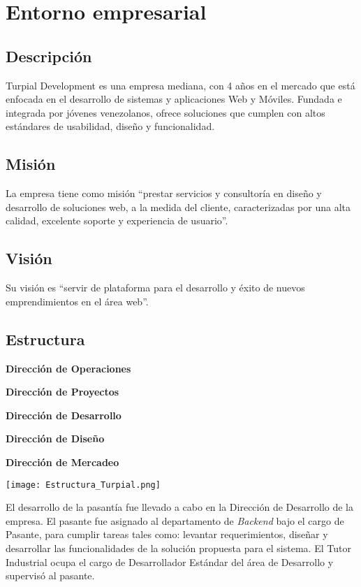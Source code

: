 \chapter{\textbf{Entorno empresarial}}

\thispagestyle{empty}

\section{Descripción}

Turpial Development es una empresa mediana, con 4 años en el mercado que está enfocada en el desarrollo de sistemas y aplicaciones Web y Móviles. Fundada e integrada por jóvenes venezolanos, ofrece soluciones que cumplen con altos estándares de usabilidad, diseño y funcionalidad.

\section{Misión}

La empresa tiene como misión “prestar servicios y consultoría en diseño y desarrollo de soluciones web, a la medida del cliente, caracterizadas por una alta calidad, excelente soporte y experiencia de usuario”.

\section{Visión}

Su visión es “servir de plataforma para el desarrollo y éxito de nuevos emprendimientos en el área web”.

\section{Estructura}

\begin{description}
    \item \textbf{Dirección de Operaciones}
    \item \textbf{Dirección de Proyectos}
    \item \textbf{Dirección de Desarrollo}
    \item \textbf{Dirección de Diseño}
    \item \textbf{Dirección de Mercadeo}
\end{description}

\texttt{[image: Estructura\_Turpial.png]}

El desarrollo de la pasantía fue llevado a cabo en la Dirección de Desarrollo de la empresa. El pasante fue asignado al departamento de \textit{Backend} bajo el cargo de Pasante, para cumplir tareas tales como: levantar requerimientos, diseñar y desarrollar las funcionalidades de la solución propuesta para el sistema. El Tutor Industrial ocupa el cargo de Desarrollador Estándar del área de Desarrollo y supervisó al pasante.



